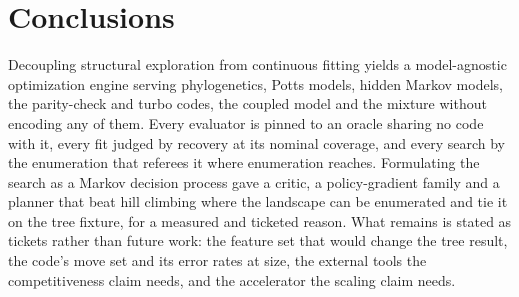 \documentclass[11pt,a4paper]{article}
\begin{document}
\section{Conclusions}
\label{sec:conclusions}

Decoupling structural exploration from continuous fitting yields a
model-agnostic optimization engine serving phylogenetics, Potts models, hidden
Markov models, the parity-check and turbo codes, the coupled model and the
mixture without encoding any of them. Every evaluator is pinned to an oracle
sharing no code with it, every fit judged by recovery at its nominal coverage,
and every search by the enumeration that referees it where enumeration reaches.
Formulating the search as a Markov decision process gave a critic, a
policy-gradient family and a planner that beat hill climbing where the
landscape can be enumerated and tie it on the tree fixture, for a measured and
ticketed reason. What remains is stated as tickets rather than future work: the
feature set that would change the tree result, the code's move set and its
error rates at size, the external tools the competitiveness claim needs, and
the accelerator the scaling claim needs.



\end{document}
